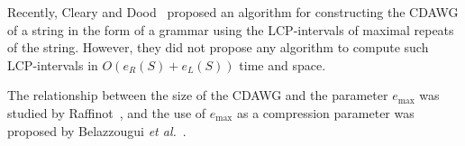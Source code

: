 \documentclass{article}
\begin{document}
Recently, Cleary and Dood~\cite{cleary2023constructing} proposed an algorithm for constructing the CDAWG of a string in the form of a grammar using the LCP-intervals of maximal repeats of the string. However, they did not propose any algorithm to compute such LCP-intervals in $O(e_R(S) + e_L(S))$ time and space.

The relationship between the size of the CDAWG and the parameter $e_{\max}$ was studied by Raffinot~\cite{raffinot2001maximal}, and the use of $e_{\max}$ as a compression parameter was proposed by Belazzougui \textit{et al.}~\cite{belazzougui:nunial:gagie:prezza:raffinot2015composite}.




\end{document}

